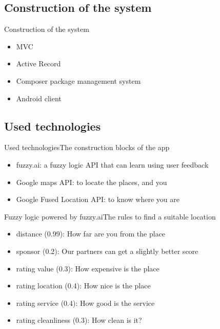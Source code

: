\documentclass{beamer}
\begin{document}
\subsection{Construction of the system}

\begin{frame}{Construction of the system}
  \begin{itemize}
  \item {MVC    
  }
  \item {Active Record     
  }
  \item {Composer package management system   
  }
  \item {Android client   
  }

  \end{itemize}
\end{frame}

\subsection{Used technologies}

\begin{frame}{Used technologies}{The construction blocks of the app}
  \begin{itemize}
  \item {fuzzy.ai: a fuzzy logic API that can learn using user feedback
  }
  \item {Google maps API: to locate the places, and you   
  }
  \item{Google Fused Location API: to know where you are
  }
  \end{itemize}
\end{frame}

\begin{frame}{Fuzzy logic powered by fuzzy.ai}{The rules to find a suitable location}
  \begin{itemize}
  \item {distance (0.99): How far are you from the place 
  }
  \item {sponsor (0.2): Our partners can get a slightly better score
  }
  \item {rating value (0.3): How expensive is the place
  }
  \item {rating location (0.4): How nice is the place
  }
  \item {rating service (0.4): How good is the service
  }
  \item {rating cleanliness (0.3): How clean is it?
  }
  \end{itemize}
\end{frame}
\end{document}
